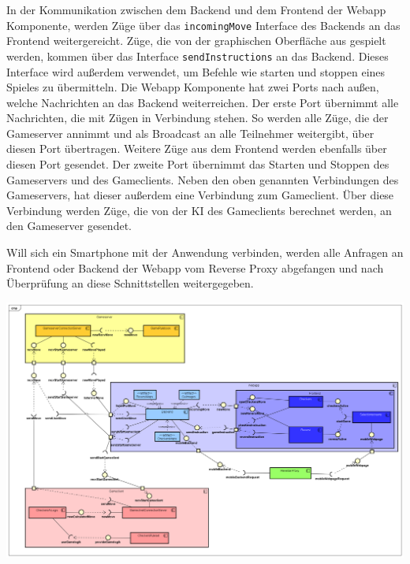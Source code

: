 \documentclass[12pt,a4paper,bibliography=totocnumbered,listof=totocnumbered]{article}
\begin{document}
In der Kommunikation zwischen dem Backend und dem Frontend der Webapp Komponente, werden Züge über das \texttt{incomingMove} Interface des Backends an das Frontend
weitergereicht. Züge, die von der graphischen Oberfläche aus gespielt werden, kommen über das Interface \texttt{sendInstructions} an das Backend. Dieses
Interface wird außerdem verwendet, um Befehle wie starten und stoppen eines Spieles zu übermitteln. Die Webapp Komponente hat zwei Ports nach außen, 
welche Nachrichten an das Backend
weiterreichen. Der erste Port übernimmt alle Nachrichten, die mit Zügen in Verbindung stehen. So werden alle Züge, die der Gameserver annimmt
und als Broadcast an alle Teilnehmer weitergibt, über diesen Port übertragen. Weitere Züge aus dem Frontend werden ebenfalls über diesen Port gesendet.
Der zweite Port übernimmt das Starten und Stoppen des Gameservers und des Gameclients. 
Neben den oben genannten Verbindungen des Gameservers, hat dieser außerdem eine Verbindung zum Gameclient. Über diese Verbindung werden Züge, die von der 
KI des Gameclients berechnet werden, an den Gameserver gesendet.

Will sich ein Smartphone mit der Anwendung verbinden, werden alle Anfragen an Frontend oder Backend der Webapp vom Reverse Proxy abgefangen und 
nach Überprüfung an diese Schnittstellen weitergegeben.


\vspace{1em}
\begin{minipage}{\linewidth}
	\centering
	\includegraphics[width=1.0\linewidth]{pics/Komponentendiagram.png}
	\label{fig:ComponentDiagram}
\end{minipage}
\end{document}
